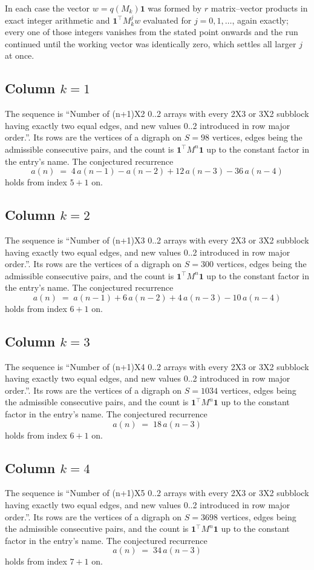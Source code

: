 \documentclass[11pt,a4paper]{article}
\theoremstyle{plain}
\theoremstyle{definition}
\begin{document}
In each case the vector $w=q(M_k)\mathbf{1}$ was formed by $r$ matrix--vector products in
exact integer arithmetic and $\mathbf{1}^{\!\top}M_k^{j}w$ evaluated for $j=0,1,\dots$,
again exactly; every one of those integers vanishes from the stated point onwards and the run
continued until the working vector was identically zero, which settles all larger $j$ at once.

\subsection*{Column $k$$=1$}
The sequence is ``Number of (n+1)X2 0..2 arrays with every 2X3 or 3X2 subblock having exactly two equal edges, and new values 0..2 introduced in row major order.''. Its rows are the vertices of a digraph on
$S=98$ vertices, edges being the admissible consecutive pairs, and the count is
$\mathbf{1}^{\!\top}M^{n}\mathbf{1}$ up to the constant factor in the entry's name.
The conjectured recurrence
\[
a(n)\;=\;4\,a(n-1) - a(n-2) + 12\,a(n-3) - 36\,a(n-4)
\]
holds from index $5+1$ on.

\subsection*{Column $k$$=2$}
The sequence is ``Number of (n+1)X3 0..2 arrays with every 2X3 or 3X2 subblock having exactly two equal edges, and new values 0..2 introduced in row major order.''. Its rows are the vertices of a digraph on
$S=300$ vertices, edges being the admissible consecutive pairs, and the count is
$\mathbf{1}^{\!\top}M^{n}\mathbf{1}$ up to the constant factor in the entry's name.
The conjectured recurrence
\[
a(n)\;=\;a(n-1) + 6\,a(n-2) + 4\,a(n-3) - 10\,a(n-4)
\]
holds from index $6+1$ on.

\subsection*{Column $k$$=3$}
The sequence is ``Number of (n+1)X4 0..2 arrays with every 2X3 or 3X2 subblock having exactly two equal edges, and new values 0..2 introduced in row major order.''. Its rows are the vertices of a digraph on
$S=1034$ vertices, edges being the admissible consecutive pairs, and the count is
$\mathbf{1}^{\!\top}M^{n}\mathbf{1}$ up to the constant factor in the entry's name.
The conjectured recurrence
\[
a(n)\;=\;18\,a(n-3)
\]
holds from index $6+1$ on.

\subsection*{Column $k$$=4$}
The sequence is ``Number of (n+1)X5 0..2 arrays with every 2X3 or 3X2 subblock having exactly two equal edges, and new values 0..2 introduced in row major order.''. Its rows are the vertices of a digraph on
$S=3698$ vertices, edges being the admissible consecutive pairs, and the count is
$\mathbf{1}^{\!\top}M^{n}\mathbf{1}$ up to the constant factor in the entry's name.
The conjectured recurrence
\[
a(n)\;=\;34\,a(n-3)
\]
holds from index $7+1$ on.
\end{document}
